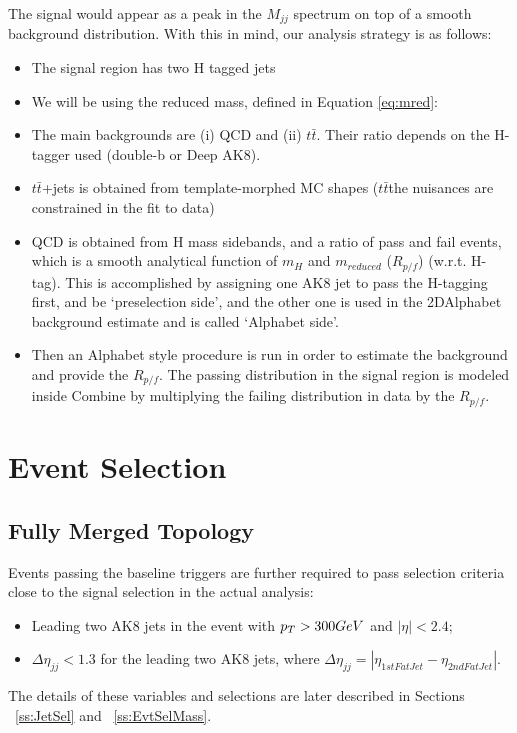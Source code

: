 The signal would appear as a peak in the $M_{jj}$ spectrum on top of a smooth background distribution. With this in mind, our analysis strategy is as follows:
\begin{itemize}
\item The signal region has two H tagged jets
\item We will be using the reduced mass, defined in Equation \ref{eq:mred}:
\item The main backgrounds are (i) QCD and (ii) $t\bar{t}$.  Their ratio depends on the H-tagger used (double-b or Deep AK8).
\item $t\bar t$+jets  is obtained from template-morphed MC shapes ($t\bar{t}$the nuisances are constrained in the fit to data)
\item QCD is obtained from H mass sidebands, and a ratio of pass and fail events, which is a smooth analytical function of $m_H$ and $m_{reduced}$ ($R_{p/f}$) (w.r.t. H-tag). This is accomplished by assigning one AK8 jet to pass the H-tagging first, and be `preselection side', and the other one is used in the 2DAlphabet background estimate and is called `Alphabet side'. 
\item Then an Alphabet style procedure is run in order to estimate the background and provide the $R_{p/f}$. The passing distribution in the signal region is modeled inside Combine by multiplying the failing distribution in data by the $R_{p/f}$.
\end{itemize}

\section{Event Selection\label{sec:EvtSel}}
\subsection{Fully Merged Topology}
Events passing the baseline triggers are further required to pass selection criteria close to the signal selection in the actual analysis:
\begin{itemize}
\item Leading two AK8 jets in the event with $p_{T} > 300 GeV$ and $|\eta| < 2.4$;
\item $\Delta \eta_{jj} < 1.3$ for the leading two AK8 jets, where $\Delta \eta_{jj} = |\eta_{1stFatJet} - \eta_{2ndFatJet}|$.
\end{itemize}
The details of these variables and selections are later described in Sections ~\ref{ss:JetSel} and ~\ref{ss:EvtSelMass}. 

